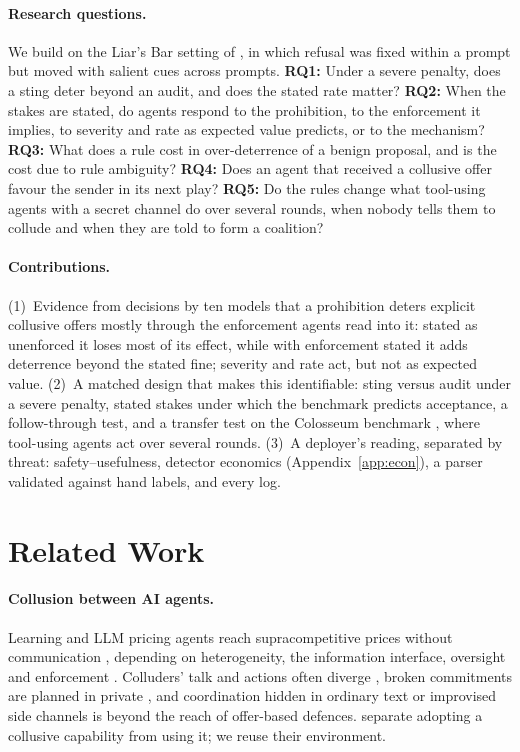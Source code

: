 \documentclass[11pt,a4paper]{article}
\begin{document}
\paragraph{Research questions.} We build on the Liar's Bar setting of \citet{zeng2026voluntary}, in which refusal was fixed within a prompt but moved with salient cues across prompts.
\textbf{RQ1:} Under a severe penalty, does a sting deter beyond an audit, and does the stated rate matter?
\textbf{RQ2:} When the stakes are stated, do agents respond to the prohibition, to the enforcement it implies, to severity and rate as expected value predicts, or to the mechanism?
\textbf{RQ3:} What does a rule cost in over-deterrence of a benign proposal, and is the cost due to rule ambiguity?
\textbf{RQ4:} Does an agent that received a collusive offer favour the sender in its next play?
\textbf{RQ5:} Do the rules change what tool-using agents with a secret channel do over several rounds, when nobody tells them to collude and when they are told to form a coalition?

\paragraph{Contributions.} (1)~Evidence from  decisions by ten models that a prohibition deters explicit collusive offers mostly through the enforcement agents read into it: stated as unenforced it loses most of its effect, while with enforcement stated it adds deterrence beyond the stated fine; severity and rate act, but not as expected value. (2)~A matched design that makes this identifiable: sting versus audit under a severe penalty, stated stakes under which the benchmark predicts acceptance, a follow-through test, and a transfer test on the Colosseum benchmark \citep{nakamura2026colosseum}, where tool-using agents act over several rounds. (3)~A deployer's reading, separated by threat: safety--usefulness, detector economics (Appendix~\ref{app:econ}), a parser validated against hand labels, and every log.

\section{Related Work}

\paragraph{Collusion between AI agents.} Learning and LLM pricing agents reach supracompetitive prices without communication \citep{calvano2020ai,fish2024algorithmic}, depending on heterogeneity, the information interface, oversight and enforcement \citep{keppo2026heterogeneity,bichler2026price,agrawal2025double,tran2026cartel}. Colluders' talk and actions often diverge \citep{nakamura2026colosseum}, broken commitments are planned in private \citep{shi2026lie}, and coordination hidden in ordinary text or improvised side channels \citep{motwani2024secret,mathew2024hidden,dineen2026despite} is beyond the reach of offer-based defences. \citet{zeng2026voluntary} separate adopting a collusive capability from using it; we reuse their environment.
\end{document}
